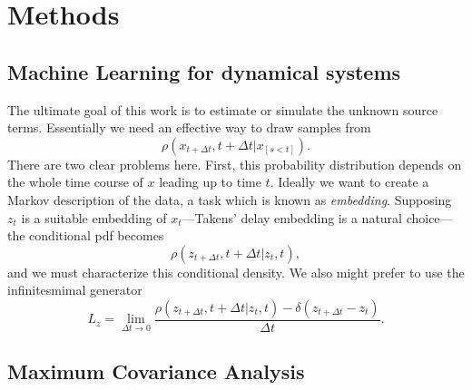 \documentclass{report}
\begin{document}
\chapter{Methods}

\section{Machine Learning for dynamical systems}

The ultimate goal of this work is to estimate or simulate the unknown source
terms. Essentially we need an effective way to draw samples
from
\[ \rho(x_{t+\Delta t}, t + \Delta t |x_{[s < t]}).\] There are two clear problems here. 
First, this probability distribution depends on the whole time course of
$x$ leading up to time $t$. 
Ideally we want to create a Markov description of the data, a task which is
known as \emph{embedding}. 
Supposing $z_t$ is a suitable embedding of $x_t$---Takens' delay embedding is a natural choice---the conditional pdf becomes
\[\rho(z_{t+\Delta t}, t+ \Delta t| z_t, t),\]
and we must characterize this conditional density.
We also might prefer to use the infinitesmimal generator
\[L_z = \lim_{\Delta t \rightarrow 0} \frac{\rho(z_{t+\Delta t}, t+ \Delta t| z_t,
    t) - \delta(z_{t+\Delta t} - z_t) }{\Delta t}.\]





\section{Maximum Covariance Analysis}
\label{sec:mca}


\printbibliography

\appendix
\end{document}
